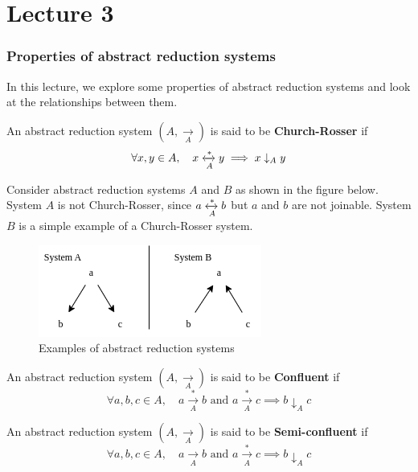 
\chapter{Lecture 3}

\subsection{Properties of abstract reduction systems}

In this lecture, we explore some properties of abstract reduction systems and look at the relationships between them.

\begin{definition}
    An abstract reduction system $( A, \xrightarrow[A]{} )$ is said to be \textbf{Church-Rosser} if $$\forall x, y \in A, \quad x \xleftrightarrow[A]{*} y \implies x \downarrow_A y$$
\end{definition}

Consider abstract reduction systems $A$ and $B$ as shown in the figure below. System $A$ is not Church-Rosser, since $a \xleftrightarrow[A]{*} b$ but $a$ and $b$ are not joinable. System $B$ is a simple example of a Church-Rosser system.

\begin{figure}[htbp]
    \center
    \includegraphics[scale=0.8]{images/lecture1/CR.png}
    \caption{Examples of abstract reduction systems}
\end{figure}


\begin{definition}
    An abstract reduction system $( A, \xrightarrow[A]{} )$ is said to be \textbf{Confluent} if $$\forall a, b, c \in A, \quad a \xrightarrow[A]{*} b \text{ and }  a \xrightarrow[A]{*} c \implies b \downarrow_A c$$
\end{definition}

\begin{definition}
    An abstract reduction system $( A, \xrightarrow[A]{} )$ is said to be \textbf{Semi-confluent} if $$\forall a, b, c \in A, \quad a \xrightarrow[A]{} b \text{ and }  a \xrightarrow[A]{*} c \implies b \downarrow_A c$$
\end{definition}

